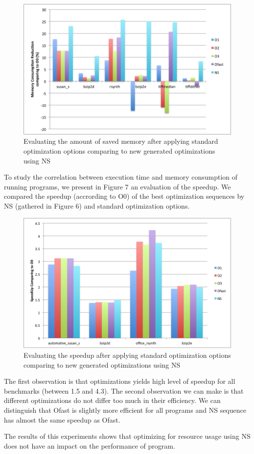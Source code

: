 \begin{figure}[h]
	\centering
	\includegraphics[scale=0.50]{Ressources/infra_novelty_stat3.png}
	\caption{Evaluating the amount of saved memory after applying standard optimization options comparing to new generated optimizations using NS}
\end{figure}
To study the correlation between execution time and memory consumption of running programs, we present in Figure 7 an evaluation of the speedup. We compared the speedup (accrording to O0) of the best optimization sequences by NS (gathered in Figure 6) and standard optimization options. 
\begin{figure}[h]
	\centering
	\includegraphics[scale=0.50]{Ressources/infra_novelty_stat2.png}
	\caption{Evaluating the speedup after applying standard optimization options comparing to new generated optimizations using NS}
\end{figure}
The first observation is that optimizations yields high level of speedup for all benchmarks (between 1.5 and 4.3).
The second observation we can make is that different optimizations do not differ too much in their
efficiency. We can distinguish that Ofast is slightly more efficient for all programs and NS sequence has almost the same speedup as Ofast. 

The results of this experiments shows that optimizing for resource usage using NS does not have an impact on the performance of program.

